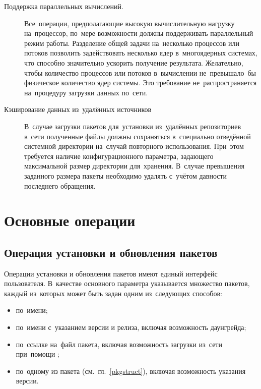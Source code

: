 \begin{description}
\item[Поддержка параллельных вычислений.]
Все~операции, предполагающие высокую вычислительную нагрузку на~процессор,
по~мере возможности должны поддерживать параллельный режим работы.
Разделение общей задачи на~несколько процессов или потоков позволить задействовать несколько ядер в~многоядерных системах,
что способно значительно ускорить получение результата. 
Желательно, чтобы количество процессов или потоков в~вычислении не~превышало~бы физическое количество ядер системы.
Это требование не~распространяется на~процедуру загрузки данных по~сети.

\item[Кэширование данных из~удалённых источников]
В~случае загрузки пакетов для~установки из~удалённых репозиториев в~сети
полученные файлы должны сохраняться в~специально отведённой системной директории на~случай повторного использования.
При~этом требуется наличие конфигурационного параметра, задающего максимальной размер директории для~хранения.
В~случае превышения заданного размера пакеты необходимо удалять с~учётом давности последнего обращения.

\end{description}

\section{Основные операции}
\subsection{Операция установки и обновления пакетов}

Операции установки и обновления пакетов имеют единый интерфейс пользователя.
В~качестве основного параметра указывается множество пакетов, каждый из~которых может быть  задан одним из~следующих способов:

\begin{itemize}

\item {по~имени;}
\item {по~имени с~указанием версии и релиза, включая возможность даунгрейда;}
\item {по~ссылке на~файл пакета, включая возможность загрузки из~сети при~помощи ;}
\item{по~одному из  пакета (см.~гл.~\ref{pkgstruct}), включая возможность указания версии.}

\end{itemize}

